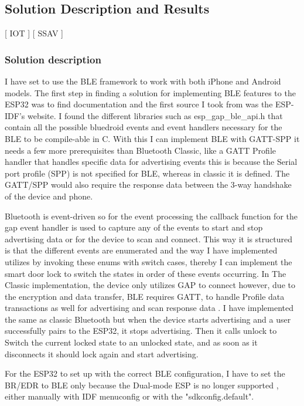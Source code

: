 \subsection{Solution Description and Results}
[ IOT ] [ SSAV ] 
\newline
\subsubsection{\textbf{Solution description}}
 I have set to use the BLE framework to work with both iPhone and Android models. The first step in finding a solution for implementing BLE features to the ESP32 was to find documentation and the first source I took from was the ESP-IDF's website. I found the different libraries such as esp\_gap\_ble\_api.h that contain all the possible bluedroid events and event handlers necessary for the BLE to be compile-able in C. With this I can implement BLE with GATT-SPP it needs a few more prerequisites than Bluetooth Classic, like a GATT Profile handler that handles specific data for advertising events this is because the Serial port profile (SPP) is not specified for BLE, whereas in classic it is defined. The GATT/SPP would also require the response data between the 3-way handshake of the device and phone.
 
 Bluetooth is event-driven so for the event processing the callback function for the gap event handler is used to capture any of the events to start and stop advertising data or for the device to scan and connect. This way it is structured is that the different events are enumerated and the way I have implemented utilizes by invoking these enums with switch cases, thereby I can implement the smart door lock to switch the states in order of these events occurring. In The Classic implementation, the device only utilizes GAP to connect however, due to the encryption and data transfer, BLE requires GATT, to handle Profile data transactions as well for advertising and scan response data \cite{ESPBLEGAP}. I have implemented the same as classic Bluetooth but when the device starts advertising and a user successfully pairs to the ESP32, it stops advertising. Then it calls unlock to Switch the current locked state to an unlocked state, and as soon as it disconnects it should lock again and start advertising. 

For the ESP32 to set up with the correct BLE configuration, I have to set the BR/EDR to BLE only because the Dual-mode ESP is no longer supported \cite{esp32beans}, either manually with IDF menuconfig or with the "sdkconfig.default". 

